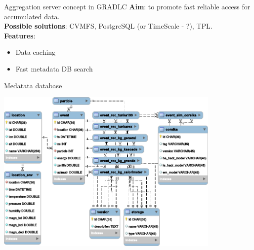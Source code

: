 

\begin{frame}{Aggregation server concept in GRADLC}
\textbf{Aim}: to promote fast reliable access for accumulated data.
\vspace{\itemsep}\\
\textbf{Possible solutions}: CVMFS, PostgreSQL (or TimeScale - ?), TPL.
\vspace{\itemsep}\\
\textbf{Features}:
  \begin{itemize}
    \item Data caching
    \item Fast metadata DB search
  \end{itemize}
\end{frame}



\begin{frame}{Medatata database}
     \begin{center}
        \includegraphics[width=0.82\textwidth]{pics/metadata.pdf}
    \end{center}
\end{frame}

